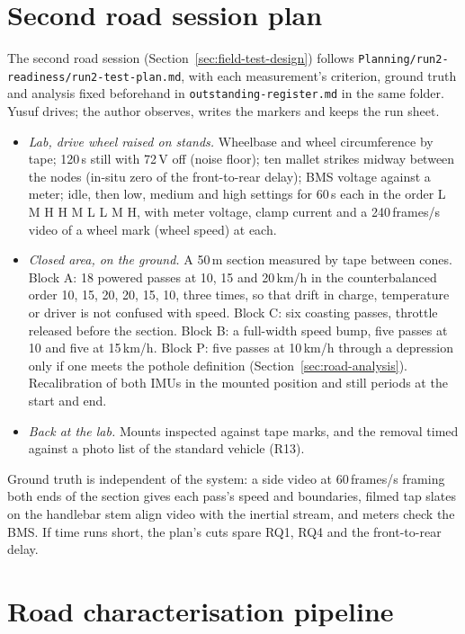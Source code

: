 \section{Second road session plan}
\label{sec:impl-run2}

The second road session (Section~\ref{sec:field-test-design}) follows \texttt{Planning/\allowbreak{}run2-readiness/\allowbreak{}run2-test-plan.md}, with each measurement's criterion, ground truth and analysis fixed beforehand in \texttt{outstanding-register.md} in the same folder. Yusuf drives; the author observes, writes the markers and keeps the run sheet.
\begin{itemize}
\item \emph{Lab, drive wheel raised on stands.} Wheelbase and wheel circumference by tape; 120\,s still with 72\,V off (noise floor); ten mallet strikes midway between the nodes (in-situ zero of the front-to-rear delay); BMS voltage against a meter; idle, then low, medium and high settings for 60\,s each in the order L M H H M L L M H, with meter voltage, clamp current and a 240\,frames/s video of a wheel mark (wheel speed) at each.
\item \emph{Closed area, on the ground.} A 50\,m section measured by tape between cones. Block A: 18 powered passes at 10, 15 and 20\,km/h in the counterbalanced order 10, 15, 20, 20, 15, 10, three times, so that drift in charge, temperature or driver is not confused with speed. Block C: six coasting passes, throttle released before the section. Block B: a full-width speed bump, five passes at 10 and five at 15\,km/h. Block P: five passes at 10\,km/h through a depression only if one meets the pothole definition (Section~\ref{sec:road-analysis}). Recalibration of both IMUs in the mounted position and still periods at the start and end.
\item \emph{Back at the lab.} Mounts inspected against tape marks, and the removal timed against a photo list of the standard vehicle (R13).
\end{itemize}
Ground truth is independent of the system: a side video at 60\,frames/s framing both ends of the section gives each pass's speed and boundaries, filmed tap slates on the handlebar stem align video with the inertial stream, and meters check the BMS. If time runs short, the plan's cuts spare RQ1, RQ4 and the front-to-rear delay.

\section{Road characterisation pipeline}
\label{sec:impl-road}

